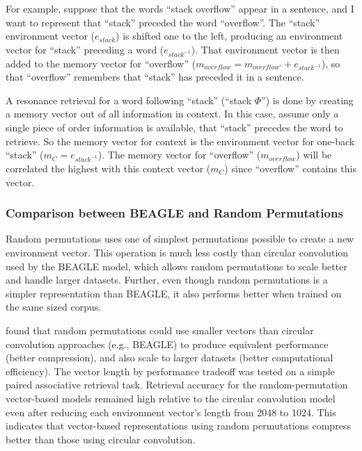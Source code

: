 \documentclass[man,floatsintext,donotrepeattitle]{apa6}
\begin{document}
For example, suppose that the words ``stack overflow'' appear in a sentence, and I want to represent that ``stack'' preceded the word ``overflow''.
The ``stack'' environment vector ($e_{stack}$) is shifted one to the left, producing an environment vector for ``stack'' preceding a word ($e_{stack^{-1}}$).
That environment vector is then added to the memory vector for ``overflow'' ($m_{overflow} = m_{overflow'} + e_{stack^{-1}}$), so that ``overflow'' remembers that ``stack'' has preceded it in a sentence.

A resonance retrieval for a word following ``stack'' (``stack $\Phi$'') is done by creating a memory vector out of all information in context.
In this case, assume only a single piece of order information is available, that ``stack'' precedes the word to retrieve.
So the memory vector for context is the environment vector for one-back ``stack'' ($m_{C} = e_{stack^{-1}}$).
The memory vector for ``overflow'' ($m_{overflow}$) will be correlated the highest with this context vector ($m_{C}$) since ``overflow'' contains this vector.

\subsubsection{Comparison between BEAGLE and Random Permutations}

Random permutations uses one of simplest permutations possible to create a new environment vector.
This operation is much less costly than circular convolution used by the BEAGLE model, which allows random permutations to scale better and handle larger datasets.
Further, even though random permutations is a simpler representation than BEAGLE, it also performs better when trained on the same sized corpus. 

\textcite{Recchia2010} found that random permutations could use smaller vectors than circular convolution approaches (e.g., BEAGLE) to produce equivalent performance (better compression),
and also scale to larger datasets (better computational efficiency).
The vector length by performance tradeoff was tested on a simple paired associative retrieval task. 
Retrieval accuracy for the random-permutation vector-based models remained high relative to the circular convolution model even after reducing each environment vector's length from \num{2048} to \num{1024}.
This indicates that vector-based representations using random permutations compress better than those using circular convolution.
\end{document}
